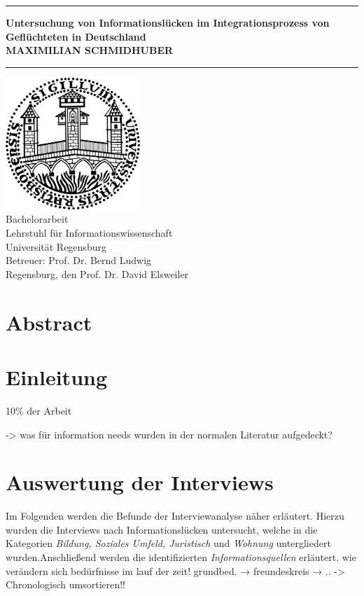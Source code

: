 \documentclass[12pt,oneside]{article}
\newcommand{\JMUTitle}[9]{

  \thispagestyle{empty}
  \vspace*{\stretch{1}}
  {\parindent0cm
  \rule{\linewidth}{.7ex}}
  \begin{flushright}
    \vspace*{\stretch{1}}
    \sffamily\bfseries\Huge
    #1\\
    \vspace*{\stretch{1}}
    \sffamily\bfseries\large
    #2
    \vspace*{\stretch{1}}
  \end{flushright}
  \rule{\linewidth}{.7ex}

  \vspace*{\stretch{1}}
  \begin{center}
    \includegraphics[width=2in]{Unisiegel.png} \\
    \vspace*{\stretch{1}}
    \Large Bachelorarbeit  \\

    \vspace*{\stretch{2}}
   \large Lehrstuhl f\"{u}r Informationswissenschaft\\
    \large Universität Regensburg\\
    \vspace*{\stretch{1}}
    \large Betreuer:  #7 \\[1mm]
    
    \vspace*{\stretch{1}}
    \large Regensburg, den #6
  \end{center}
}
\begin{document}
  \JMUTitle
      {Untersuchung von Informationslücken im Integrationsprozess von Geflüchteten in Deutschland}        %
      {MAXIMILIAN SCHMIDHUBER}                  %
      
      {Fakultät für Sprach-, Literatur- und Kulturwissenschaften}  %
      {Regensburg 2019}                          %
      {24.05.2019}                              %
      {Prof. Dr. David Elsweiler}               %
      {Prof. Dr. Bernd Ludwig}                  %
      
  \clearpage

\lhead{}
    \setcounter{page}{1}

\tableofcontents
\clearpage

\listoffigures

\listoftables
\clearpage

\section*{Abstract}

\blindtext


\cleardoublepage
{}  
    \setcounter{page}{1}
\lhead{\nouppercase{\leftmark}}


\section{Einleitung} \label{einleitung}

10\% der Arbeit






-> was für information needs wurden in der normalen Literatur aufgedeckt?




\section{Auswertung der Interviews}
Im Folgenden werden die Befunde der Interviewanalyse näher erläutert. Hierzu wurden die Interviews nach Informationslücken untersucht, welche in die Kategorien \textit{Bildung, Soziales Umfeld, Juristisch} und \textit{Wohnung} untergliedert wurden.Anschließend werden die identifizierten \textit{Informationsquellen} erläutert.
wie verändern sich bedürfnisse im lauf der zeit!
grundbed. → freundeskreis → ..
		-> Chronologisch umsortieren!!
		
\end{document}
